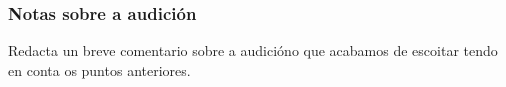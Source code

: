 \subsubsection*{Notas sobre a audición}
Redacta un breve comentario sobre a audicióno que acabamos de escoitar tendo en conta os puntos anteriores.
%
\begin{ejercicio}
        \vspace*{2.78cm}
\end{ejercicio}
%
%
%
%
%
%
%
%
